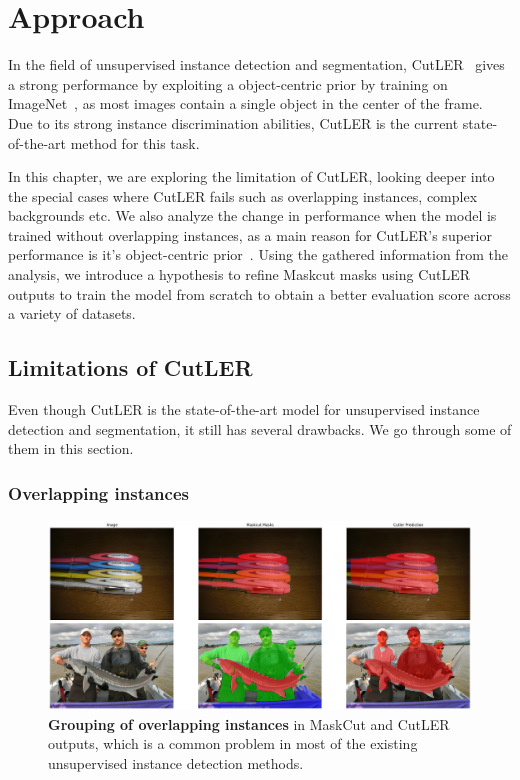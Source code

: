 \chapter{Approach}\label{chap:approach}

In the field of unsupervised instance detection and segmentation, CutLER~\cite{wang2023cut} gives a strong performance by exploiting a  object-centric prior by training on ImageNet~\cite{deng2009imagenet}, as most images contain a single
object in the center of the frame.  Due to its strong instance discrimination abilities, CutLER is the current state-of-the-art method for this task.

In this chapter, we are exploring the limitation of CutLER, looking deeper into the special cases where CutLER fails such as overlapping instances, complex backgrounds etc. We also analyze the change in performance when the model is trained without overlapping instances, as a main reason for CutLER's superior  performance is it's object-centric prior~\cite{engstler2023understanding}. Using the gathered information from the analysis, we introduce a hypothesis to refine Maskcut masks using CutLER outputs to train the model from scratch to obtain a better evaluation score across a variety of datasets.

\section{Limitations of CutLER}
Even though CutLER is the state-of-the-art model for unsupervised instance detection and segmentation, it still has several drawbacks. We go through some of them in this section.

\subsection{Overlapping instances}
\begin{figure}
	\centering
	\includegraphics[width=1\textwidth]{Images/main/cutler-prob-overlap.png}
	\caption[\textbf{Cutler performance on images with overlapping instances}]{\textbf{Grouping of overlapping instances} in MaskCut and CutLER outputs, which is a common problem in most of the existing unsupervised instance detection methods.}
	\label{fig:cutler_overlapping_instances_eg}
\end{figure}

